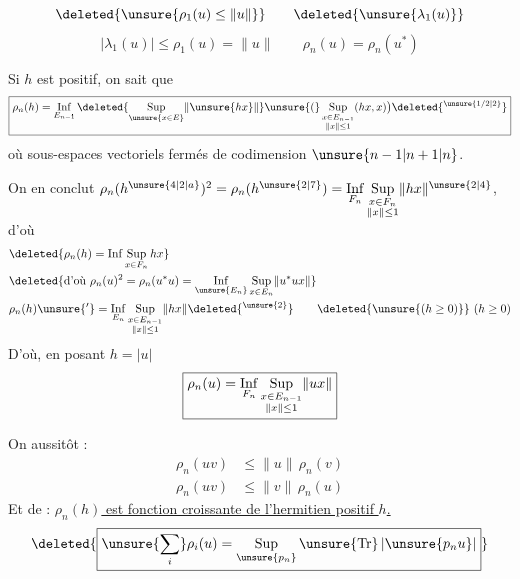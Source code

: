 \[
\deleted{\unsure{\rho_1(u)\leq\lVert u\rVert}}\qquad\deleted{\unsure{\lambda_1(u)}}
\]
\[
\boxed{\lvert\lambda_1(u)\rvert\leq\rho_1(u)=\lVert u\rVert}
\qquad\boxed{\rho_n(u)=\rho_n(u^*)}
\]

Si $h$ est  positif, on sait que
\[
\boxed{\rho_n(h)=\mathop{\rm Inf}\limits_{E_{n-1}}
\deleted{\mathop{\rm Sup}\limits_{\unsure{x\in E}}\lVert\unsure{hx}\rVert}
\unsure{(}\mathop{\rm Sup}\limits_{\substack{x\in E_{n-1}\\\lVert x\rVert\leq1}}(hx,x)\bigr)\deleted{{}^{\unsure{1/2|2}}}}
\]
 où   sous-espaces vectoriels fermés de codimension $\unsure{n-1|n+1|n}$. 

On en conclut $\rho_n(h^{\unsure{4|2|a}})^2=\rho_n(h^{\unsure{2|7}})=\mathop{\rm Inf}\limits_{F_n}\mathop{\rm Sup}\limits_{\substack{x\in F_n\\\lVert x\rVert\leq1}}\lVert hx\rVert^{\unsure{2|4}}$,  d'où
\[
\begin{aligned}
&\deleted{\rho_n(h)=\mathop{\rm Inf}\mathop{\rm Sup}\limits_{x\in F_n}hx}\\
&\deleted{\text{d'où }\rho_n(u)^2=\rho_n(u^*u)=\mathop{\rm Inf}\limits_{\unsure{E_n}}\mathop{\rm Sup}\limits_{x\in E_n}\lVert u^*ux\rVert}\\
&\rho_n(h)\unsure{'}=\mathop{\rm Inf}\limits_{E_n}\mathop{\rm Sup}\limits_{\substack{x\in E_{n-1}\\\lVert x\rVert\leq1}}\lVert hx\rVert\deleted{{}^{\unsure{2}}}\qquad \deleted{\unsure{(h\geq0)}}\ (h\geq0)
\end{aligned}
\]
D'où, en posant $h=\lvert u\rvert$
\[
\boxed{\rho_n(u)=\mathop{\rm Inf}\limits_{F_n}\mathop{\rm Sup}\limits_{\substack{x\in E_{n-1}\\\lVert x\rVert\leq1}}\lVert ux\rVert}
\]

On   aussitôt :
\[
\boxed{\begin{aligned}
\rho_n(uv)&\leq\lVert u\rVert\,\rho_n(v)\\
\rho_n(uv)&\leq\lVert v\rVert\,\rho_n(u)
\end{aligned}}
\]
Et de  : \uline{$\rho_n(h)$ est fonction croissante de l'hermitien positif $h$.}   
\[
\deleted{\boxed{\unsure{\sum_i}\rho_i(u)=\mathop{\rm Sup}\limits_{\unsure{p_n}}\unsure{\mathrm{Tr}}\,\lvert\unsure{p_nu}\rvert}}
\]

